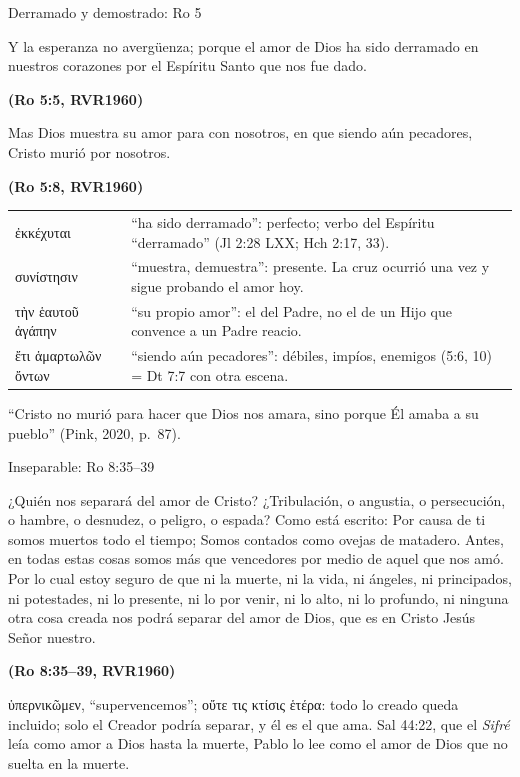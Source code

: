 \documentclass[hyperref={bookmarks=false},aspectratio=169]{beamer}
\newcommand{\grc}[1]{\foreignlanguage{ancientgreek}{#1}}
\newcommand{\fuente}[1]{\par\hfill{\upshape\bfseries\footnotesize\textcolor{azul}{#1}}}
\begin{document}
\begin{frame}{Derramado y demostrado: Ro 5}
\begin{cita}Y la esperanza no avergüenza; porque el amor de Dios ha sido derramado en nuestros corazones por el Espíritu Santo que nos fue dado.\fuente{(Ro 5:5, RVR1960)}\end{cita}
\begin{cita}Mas Dios muestra su amor para con nosotros, en que siendo aún pecadores, Cristo murió por nosotros.\fuente{(Ro 5:8, RVR1960)}\end{cita}
\renewcommand{\arraystretch}{1.08}\scriptsize
\begin{tabular}{@{}>{\RaggedRight\arraybackslash}p{2.6cm}>{\RaggedRight\arraybackslash}p{9.3cm}@{}}
\grc{ἐκκέχυται} & ``ha sido derramado'': perfecto; verbo del Espíritu ``derramado'' (Jl 2:28 LXX; Hch 2:17, 33). \\
\grc{συνίστησιν} & ``muestra, demuestra'': presente. La cruz ocurrió una vez y sigue probando el amor hoy. \\
\grc{τὴν ἑαυτοῦ ἀγάπην} & ``su propio amor'': el del Padre, no el de un Hijo que convence a un Padre reacio. \\
\grc{ἔτι ἁμαρτωλῶν ὄντων} & ``siendo aún pecadores'': débiles, impíos, enemigos (5:6, 10) = Dt 7:7 con otra escena. \\
\end{tabular}\par\smallskip
\scriptsize ``Cristo no murió para hacer que Dios nos amara, sino porque Él amaba a su pueblo'' (Pink, 2020, p.~87).
\end{frame}

\begin{frame}{Inseparable: Ro 8:35--39}
\begin{cita}¿Quién nos separará del amor de Cristo? ¿Tribulación, o angustia, o persecución, o hambre, o desnudez, o peligro, o espada? Como está escrito: Por causa de ti somos muertos todo el tiempo; Somos contados como ovejas de matadero. Antes, en todas estas cosas somos más que vencedores por medio de aquel que nos amó. Por lo cual estoy seguro de que ni la muerte, ni la vida, ni ángeles, ni principados, ni potestades, ni lo presente, ni lo por venir, ni lo alto, ni lo profundo, ni ninguna otra cosa creada nos podrá separar del amor de Dios, que es en Cristo Jesús Señor nuestro.\fuente{(Ro 8:35--39, RVR1960)}\end{cita}
\scriptsize\grc{ὑπερνικῶμεν}, ``supervencemos''; \grc{οὔτε τις κτίσις ἑτέρα}: todo lo creado queda incluido; solo el Creador podría separar, y él es el que ama. Sal 44:22, que el \emph{Sifré} leía como amor a Dios hasta la muerte, Pablo lo lee como el amor de Dios que no suelta en la muerte.
\end{frame}
\end{document}
